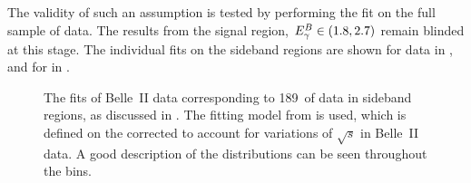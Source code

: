 The validity of such an assumption is tested by performing the \Mbc fit on the full sample of data. 
The results from the signal region, ${E^B_{\gamma}}\in(1.8,2.7)$ remain blinded at this stage.
The individual \Mbc fits on the \EB sideband regions are shown for data in , and for \MC in .
\begin{figure}[hbtp!]
    \centering
    \caption{\label{fig:sideband_data_fit}    
    The \Mbc fits of Belle~II data corresponding to 189~\invfb of data in \EB sideband regions,
    as discussed in .
    The fitting model from  is used,
    which is defined on the corrected \Mbc to account for variations of $\sqrt{s}$ in Belle~II data.
    A good description of the \Mbc distributions can be seen throughout the \EB bins.
    }
\end{figure}
